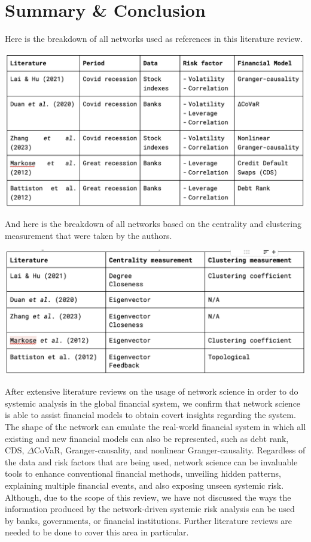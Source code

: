 \documentclass[a4paper,11pt]{article}
\begin{document}
\section{Summary \& Conclusion}
Here is the breakdown of all networks used as references in this literature review.

\includegraphics[scale=0.5]{comparison_1.png}

And here is the breakdown of all networks based on the centrality and clustering measurement that were taken by the authors.

\includegraphics[scale=0.5]{comparison_2.png}

After extensive literature reviews on the usage of network science in order to do systemic analysis in the global financial system, we confirm that network science is able to assist financial models to obtain covert insights regarding the system. The shape of the network can emulate the real-world financial system in which all existing and new financial models can also be represented, such as debt rank, CDS, $\Delta$CoVaR, Granger-causality, and nonlinear Granger-causality. Regardless of the data and risk factors that are being used, network science can be invaluable tools to enhance conventional financial methods, unveiling hidden patterns, explaining multiple financial events, and also exposing unseen systemic risk. Although, due to the scope of this review, we have not discussed the ways the information produced by the network-driven systemic risk analysis can be used by banks, governments, or financial institutions. Further literature reviews are needed to be done to cover this area in particular.
\end{document}
